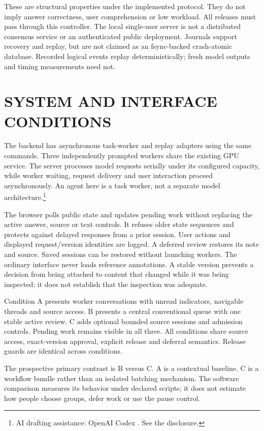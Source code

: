 \documentclass[a4paper,twoside]{article}
\newcommand{\credit}{\footnote{AI drafting assistance: OpenAI Codex \cite{codex}. See the disclosure.}}
\begin{document}
These are structural properties under the implemented protocol. They do not imply
answer correctness, user comprehension or low workload. All releases must pass
through this controller. The local single-user server is not a distributed consensus
service or an authenticated public deployment. Journals support recovery and replay,
but are not claimed as an fsync-backed crash-atomic database. Recorded logical events
replay deterministically; fresh model outputs and timing measurements need not.

\section{SYSTEM AND INTERFACE CONDITIONS}
The backend has asynchronous task-worker and replay adapters using the same
commands. Three independently prompted workers share the existing GPU service.
The server processes model requests serially under its configured capacity, while
worker waiting, request delivery and user interaction proceed asynchronously.
An agent here is a task worker, not a separate model architecture.\credit

The browser polls public state and updates pending work without replacing the
active answer, source or text controls. It refuses older state sequences and
protects against delayed responses from a prior session. User actions and displayed
request/version identities are logged. A deferred review restores its note and
source. Saved sessions can be restored without launching workers. The ordinary
interface never loads reference annotations. A stable version prevents a decision
from being attached to content that changed while it was being inspected; it does
not establish that the inspection was adequate.

Condition A presents worker conversations with unread indicators, navigable
threads and source access. B presents a central conventional queue with one stable
active review. C adds optional bounded source sessions and admission controls.
Pending work remains visible in all three. All conditions share source access, exact-version
approval, explicit release and deferral semantics. Release guards are identical across conditions.

The prospective primary contrast is B versus C. A is a contextual baseline.
C is a workflow bundle rather than an isolated batching mechanism. The software
comparison measures its behavior under declared scripts; it does not estimate
how people choose groups, defer work or use the pause control.
\end{document}
